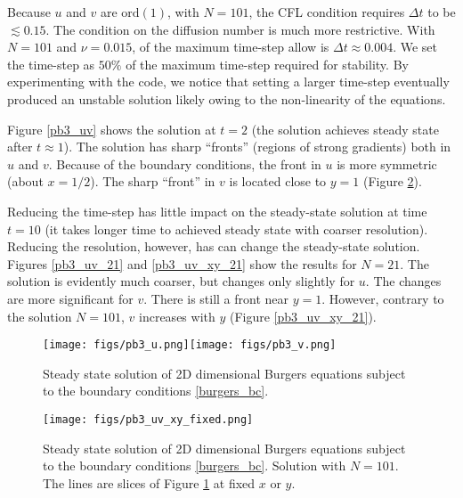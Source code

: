 \documentclass[11pt]{article}
\newcommand{\ord}{\mbox{ord}}
\begin{document}
Because $u$ and $v$ are $\ord{(1)}$, with $N = 101$, the CFL condition requires  $\Delta t$ to be $\lesssim 0.15$. The condition on the diffusion number is much more restrictive. With $N=101$ and $\nu = 0.015$,  of the maximum time-step allow is $\Delta t \approx 0.004$.  We set the time-step as $50 \%$ of the maximum time-step required for stability. By experimenting with the code, we notice that setting a larger time-step eventually produced an unstable solution likely owing to the non-linearity of the equations.

Figure \eqref{pb3_uv} shows the solution at $t = 2$ (the solution achieves steady state after $t\approx 1$). The solution has sharp ``fronts'' (regions of strong gradients) both in $u$ and $v$. Because of the boundary conditions, the front in $u$ is more symmetric (about $x = 1/2$). The sharp ``front'' in $v$ is located close to $y=1$ (Figure \ref{pb3_uv_xy}).

Reducing the time-step has little impact on the steady-state solution at time $t = 10$ (it takes longer time to achieved steady state with coarser resolution). Reducing the resolution, however, has can change the steady-state solution. Figures \ref{pb3_uv_21} and \ref{pb3_uv_xy_21} show the results for $N=21$. The solution is evidently much coarser, but changes only slightly for $u$. The changes are more significant for $v$. There is still a front near $y=1$. However, contrary to the solution $N=101$, $v$ increases with $y$ (Figure \ref{pb3_uv_xy_21}).


\begin{figure}[p]
\begin{center}
    \texttt{[image: figs/pb3\_u.png]}\texttt{[image: figs/pb3\_v.png]}     
\end{center}    
\caption{Steady state solution of 2D dimensional Burgers equations subject to the boundary conditions \eqref{burgers_bc}.}
\label{pb3_uv}
\end{figure}


\begin{figure}[p]
\begin{center}
    \texttt{[image: figs/pb3\_uv\_xy\_fixed.png]}    
\end{center}    
\caption{Steady state solution of 2D dimensional Burgers equations subject to the boundary conditions \eqref{burgers_bc}. Solution with $N=101$. The lines are slices of Figure \ref{pb3_uv} at fixed $x$ or $y$.}
\label{pb3_uv_xy}
\end{figure}
\end{document}
